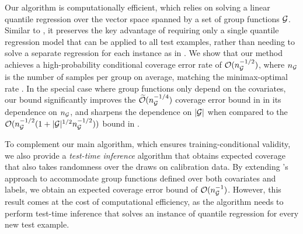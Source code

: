 Our algorithm is computationally efficient, which relies on solving a linear quantile regression over the vector space spanned by a set of group functions ${\cal G}$. Similar to \citet{JNRR2023}, it preserves the key advantage of requiring only a single quantile regression model that can be applied to all test examples, rather than needing to solve a separate regression for each instance as in \citet{GCC2023}. We show that our method achieves a high-probability conditional coverage error rate of 
$\mathcal O(n_{{\cal G}}^{-1/2})$, where $n_{{\cal G}}$ is the number of samples per group on average, matching the minimax-optimal rate \citep{ACDR24}.
In the special case where group functions only depend on the covariates,  our bound significantly improves the $\widetilde{ \mathcal  O}(n_{{\cal G}}^{-1/4})$ coverage error bound in \citet{RO22, JNRR2023} in its dependence on $n_{{\cal G}}$, and sharpens the dependence on $|{\cal G}|$  when compared to the $\mathcal O(n_{{\cal G}}^{-1/2}(1 + |{\cal G}|^{1/2}n_{{\cal G}}^{-1/2}))$ bound in \citet{ACDR24}.





To complement our main algorithm, which ensures training-conditional validity, we also provide a \emph{test-time inference} algorithm that obtains expected coverage that also takes randomness over the draws on calibration data. By extending \citet{GCC2023}’s approach to accommodate group functions defined over both covariates and labels, we obtain an expected coverage error bound of $\mathcal O(n_{{\cal G}}^{-1})$. However, this result comes at the cost of computational efficiency, as the algorithm needs to perform test-time inference that solves an instance of quantile regression for every new test example.

